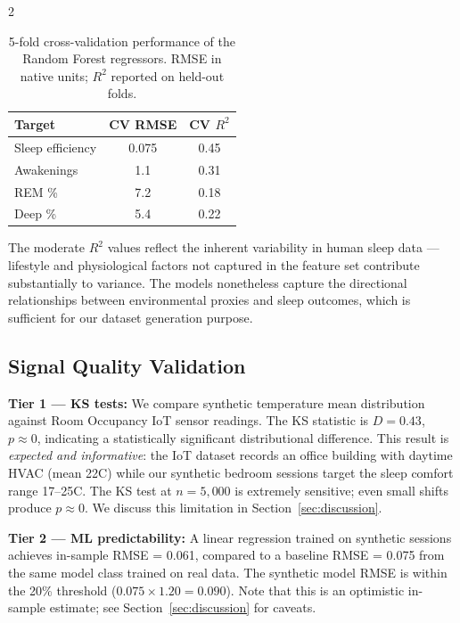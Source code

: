 \documentclass[11pt,a4paper]{article}
\begin{document}
\begin{multicols}{2}
\begin{table}[t]
  \centering
  \small
  \caption{5-fold cross-validation performance of the Random Forest regressors.
           RMSE in native units; $R^2$ reported on held-out folds.}
  \label{tab:cv}
  \begin{tabular}{@{}lcc@{}}
    \toprule
    \textbf{Target} & \textbf{CV RMSE} & \textbf{CV $R^2$} \\
    \midrule
    Sleep efficiency & 0.075 & 0.45 \\
    Awakenings & 1.1 & 0.31 \\
    REM \% & 7.2 & 0.18 \\
    Deep \% & 5.4 & 0.22 \\
    \bottomrule
  \end{tabular}
\end{table}

The moderate $R^2$ values reflect the inherent variability in human sleep data —
lifestyle and physiological factors not captured in the feature set contribute
substantially to variance.  The models nonetheless capture the directional
relationships between environmental proxies and sleep outcomes, which is
sufficient for our dataset generation purpose.

\subsection{Signal Quality Validation}

\textbf{Tier 1 — KS tests:}
We compare synthetic temperature mean distribution against Room Occupancy IoT
sensor readings.  The KS statistic is $D = 0.43$, $p \approx 0$, indicating a
statistically significant distributional difference.  This result is
\textit{expected and informative}: the IoT dataset records an office building
with daytime HVAC (mean 22\textdegree{}C) while our synthetic bedroom sessions
target the sleep comfort range 17–25\textdegree{}C.  The KS test at $n = 5{,}000$
is extremely sensitive; even small shifts produce $p \approx 0$.  We discuss
this limitation in Section~\ref{sec:discussion}.

\textbf{Tier 2 — ML predictability:}
A linear regression trained on synthetic sessions achieves in-sample
RMSE = 0.061, compared to a baseline RMSE = 0.075 from the same model class
trained on real data.  The synthetic model RMSE is within the
20\% threshold ($0.075 \times 1.20 = 0.090$).  Note that this is an
optimistic in-sample estimate; see Section~\ref{sec:discussion} for caveats.


\end{multicols}
\end{document}
